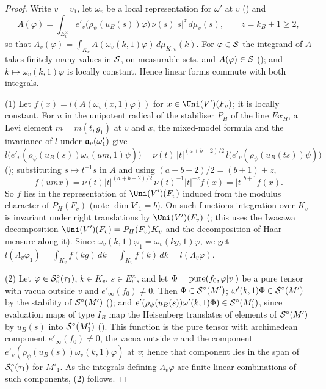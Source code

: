 \begin{proof}
Write $v=v_1$, let $\omega_v$ be a local representation for $\omega'$ at $v$
() and
\[
A(\varphi)=\int_{E_v^\times}e'_v\bigl(\rho_\psi(u_B(s))\varphi\bigr)\,\nu(s)|s|^{z}\,d\mu_v(s),\qquad z=k_B+1\ge2,
\]
so that $\Lambda_v(\varphi)=\int_{K_v}A(\omega_v(k,1)\varphi)\,d\mu_{K,v}(k)$. For $\varphi\in\mathcal{S}$ the integrand of $A$
takes finitely many values in $\mathcal{S}$, on measurable sets, and $A(\varphi)\in\mathcal{S}$
(); and $k\mapsto\omega_v(k,1)\varphi$ is locally constant. Hence linear
forms commute with both integrals.

(1) Let $f(x)=l(A(\omega_v(x,1)\varphi))$ for $x\in\Uni(V')(F_v)$; it is locally constant. For $u$ in the unipotent radical of
the stabiliser $P_H$ of the line $E x_H$, a Levi element $m=m(t,g_1)$ at $v$ and $x$, the mixed-model formula and the
invariance of $l$ under $\mathfrak{a}_v(\omega'_1)$ give
\[
l\bigl(e'_v(\rho_\psi(u_B(s))\omega_v(um,1)\psi)\bigr)=\nu(t)\,|t|^{(a+b+2)/2}\,l\bigl(e'_v(\rho_\psi(u_B(ts))\psi)\bigr)
\]
(); substituting $s\mapsto t^{-1}s$ in $A$ and using $(a+b+2)/2=(b+1)+z$,
\[
f(umx)=\nu(t)|t|^{(a+b+2)/2}\,\nu(t)^{-1}|t|^{-z}f(x)=|t|^{b+1}f(x).
\]
So $f$ lies in the representation of $\Uni(V')(F_v)$ induced from the modulus character of $P_H(F_v)$ (note $\dim V'_1=b$).
On such functions integration over $K_v$ is invariant under right translations by $\Uni(V')(F_v)$
(; this uses the Iwasawa decomposition $\Uni(V')(F_v)=P_H(F_v)K_v$ and the
decomposition of Haar measure along it). Since $\omega_v(k,1)\varphi_1=\omega_v(kg,1)\varphi$, we get
$l(\Lambda_v\varphi_1)=\int_{K_v}f(kg)\,dk=\int_{K_v}f(k)\,dk=l(\Lambda_v\varphi)$.

(2) Let $\varphi\in\mathcal{S}^{\circ}_v(\tau_1)$, $k\in K_v$, $s\in E_v^\times$, and let $\Phi=\operatorname{pure}(f_0,\varphi[v])$ be a pure tensor
with vacua outside $v$ and $e'_\infty(f_0)\ne0$. Then $\Phi\in\mathcal{S}^{\circ}(M')$; $\omega'(k,1)\Phi\in\mathcal{S}^{\circ}(M')$ by the
stability of $\mathcal{S}^{\circ}(M')$ (); and $e'(\rho_\psi(u_B(s))\omega'(k,1)\Phi)\in
\mathcal{S}^{\circ}(M'_1)$, since evaluation maps of type $I_B$ map the Heisenberg translates of elements of $\mathcal{S}^{\circ}(M')$ by
$u_B(s)$ into $\mathcal{S}^{\circ}(M'_1)$ (). This function is the pure tensor with archimedean
component $e'_\infty(f_0)\ne0$, the vacua outside $v$ and the component $e'_v(\rho_\psi(u_B(s))\omega_v(k,1)\varphi)$ at $v$;
hence that component lies in the span of $\mathcal{S}^{\circ}_v(\tau_1)$ for $M'_1$. As the integrals defining $\Lambda_v\varphi$ are
finite linear combinations of such components, (2) follows.
\end{proof}

